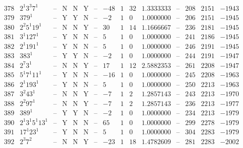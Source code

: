 \documentclass[11pt,reqno,a4letter]{article}
\numberwithin{figure}{section}
\numberwithin{table}{section}
\theoremstyle{plain}
\numberwithin{theorem}{section}
\theoremstyle{definition}
\begin{document}
\begin{table}[h!]
\begin{equation*}
{\begin{array}{|cc|c|ccc|c|c|ccc|c|ccc}
 378 & 2^1 3^3 7^1 & \text{--} & \text{N} & \text{N} & \text{Y} & \text{--} & -48 & 1 & 32 & 1.3333333 & \text{--} & 208 & 2151 & -1943 \\
 379 & 379^1 & \text{--} & \text{Y} & \text{Y} & \text{N} & \text{--} & -2 & 1 & 0 & 1.0000000 & \text{--} & 206 & 2151 & -1945 \\
 380 & 2^2 5^1 19^1 & \text{--} & \text{N} & \text{N} & \text{Y} & \text{--} & 30 & 1 & 14 & 1.1666667 & \text{--} & 236 & 2181 & -1945 \\
 381 & 3^1 127^1 & \text{--} & \text{Y} & \text{N} & \text{N} & \text{--} & 5 & 1 & 0 & 1.0000000 & \text{--} & 241 & 2186 & -1945 \\
 382 & 2^1 191^1 & \text{--} & \text{Y} & \text{N} & \text{N} & \text{--} & 5 & 1 & 0 & 1.0000000 & \text{--} & 246 & 2191 & -1945 \\
 383 & 383^1 & \text{--} & \text{Y} & \text{Y} & \text{N} & \text{--} & -2 & 1 & 0 & 1.0000000 & \text{--} & 244 & 2191 & -1947 \\
 384 & 2^7 3^1 & \text{--} & \text{N} & \text{N} & \text{Y} & \text{--} & 17 & 1 & 12 & 2.5882353 & \text{--} & 261 & 2208 & -1947 \\
 385 & 5^1 7^1 11^1 & \text{--} & \text{Y} & \text{N} & \text{N} & \text{--} & -16 & 1 & 0 & 1.0000000 & \text{--} & 245 & 2208 & -1963 \\
 386 & 2^1 193^1 & \text{--} & \text{Y} & \text{N} & \text{N} & \text{--} & 5 & 1 & 0 & 1.0000000 & \text{--} & 250 & 2213 & -1963 \\
 387 & 3^2 43^1 & \text{--} & \text{N} & \text{N} & \text{Y} & \text{--} & -7 & 1 & 2 & 1.2857143 & \text{--} & 243 & 2213 & -1970 \\
 388 & 2^2 97^1 & \text{--} & \text{N} & \text{N} & \text{Y} & \text{--} & -7 & 1 & 2 & 1.2857143 & \text{--} & 236 & 2213 & -1977 \\
 389 & 389^1 & \text{--} & \text{Y} & \text{Y} & \text{N} & \text{--} & -2 & 1 & 0 & 1.0000000 & \text{--} & 234 & 2213 & -1979 \\
 390 & 2^1 3^1 5^1 13^1 & \text{--} & \text{Y} & \text{N} & \text{N} & \text{--} & 65 & 1 & 0 & 1.0000000 & \text{--} & 299 & 2278 & -1979 \\
 391 & 17^1 23^1 & \text{--} & \text{Y} & \text{N} & \text{N} & \text{--} & 5 & 1 & 0 & 1.0000000 & \text{--} & 304 & 2283 & -1979 \\
 392 & 2^3 7^2 & \text{--} & \text{N} & \text{N} & \text{Y} & \text{--} & -23 & 1 & 18 & 1.4782609 & \text{--} & 281 & 2283 & -2002 \\

\end{array}}
\end{equation*}
\end{table}
\end{document}
